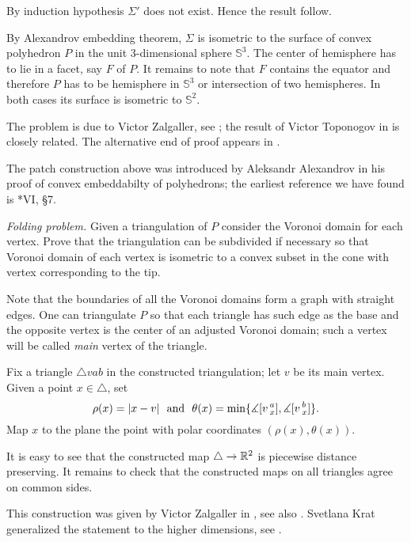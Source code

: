 By induction hypothesis $\Sigma'$ does not exist. Hence the result follow.

By Alexandrov embedding theorem, $\Sigma$ is isometric to the surface of convex polyhedron $P$ in the unit 3-dimensional sphere $\mathbb S^3$. 
The center of hemisphere has to lie in a facet, say $F$ of $P$.
It remains to note that $F$ contains the equator and therefore $P$ has to be hemisphere in $\mathbb S^3$ or intersection of two hemispheres.
In both cases its surface is isometric to $\mathbb S^2$.

The problem is due to Victor Zalgaller, 
see \cite{zalgaller-shperical-polygon};
the result of Victor Toponogov in \cite{toponogov} is closely related.
The alternative end of proof appears in \cite{panov-petrunin}.

The patch construction above was introduced by 
Aleksandr Alexandrov
in his proof of convex embeddabilty of polyhedrons;
the earliest reference we have found is
\cite{alexandrov1948}*{VI, \S7}.




\textit{Folding problem.}
Given a triangulation of $P$
consider the Voronoi domain for each vertex.
Prove that the triangulation can be subdivided if necessary
so that Voronoi domain of each vertex is isometric to a convex subset in the cone with vertex corresponding to the tip.

Note that the boundaries of all the Voronoi domains form a graph with straight edges.
One can triangulate $P$ so that each triangle has such edge as the base 
and the opposite vertex is the center of an adjusted Voronoi domain; such a vertex will be called \emph{main} vertex of the triangle.

Fix a triangle $\triangle vab$ in the constructed triangulation; 
let $v$ be its main vertex.
Given a point 
$x\in  \triangle$, set 
\[\rho(x)=|x-v|\ \ \text{and}\ \  \theta(x)=\min \{\measuredangle \hinge vax,\measuredangle\hinge vbx\}.\]
Map $x$ to the plane the point with polar coordinates $(\rho(x),\theta(x))$.

It is easy to see that the constructed map $\triangle\to\mathbb{R}^2$ is piecewise distance preserving.
It remains to check that the constructed maps on all triangles agree on common sides.


This construction was given by Victor Zalgaller in \cite{zalgaller-polyhedra}, see also \cite{petrunin-yashinsky}.
Svetlana Krat generalized the statement to the higher dimensions,
see \cite{krat}.



